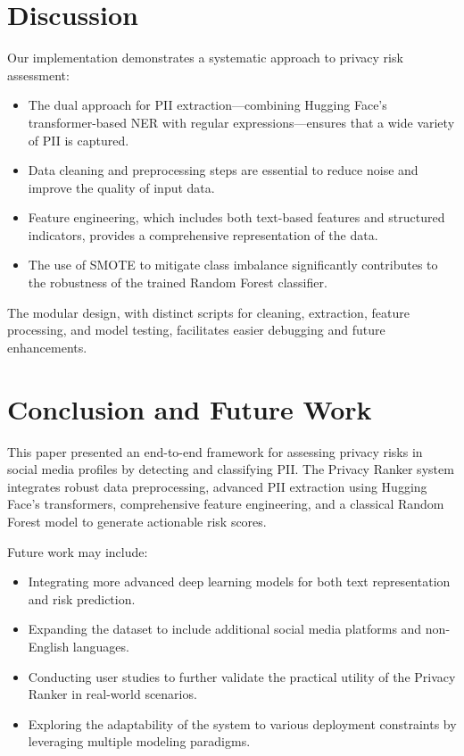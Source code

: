 \documentclass{article}
\begin{document}
\section{Discussion}
Our implementation demonstrates a systematic approach to privacy risk assessment:
\begin{itemize}
    \item The dual approach for PII extraction—combining Hugging Face’s transformer-based NER with regular expressions—ensures that a wide variety of PII is captured.
    \item Data cleaning and preprocessing steps are essential to reduce noise and improve the quality of input data.
    \item Feature engineering, which includes both text-based features and structured indicators, provides a comprehensive representation of the data.
    \item The use of SMOTE to mitigate class imbalance significantly contributes to the robustness of the trained Random Forest classifier.
\end{itemize}
The modular design, with distinct scripts for cleaning, extraction, feature processing, and model testing, facilitates easier debugging and future enhancements.

\section{Conclusion and Future Work}
This paper presented an end-to-end framework for assessing privacy risks in social media profiles by detecting and classifying PII. The Privacy Ranker system integrates robust data preprocessing, advanced PII extraction using Hugging Face’s transformers, comprehensive feature engineering, and a classical Random Forest model to generate actionable risk scores.

Future work may include:
\begin{itemize}
    \item Integrating more advanced deep learning models for both text representation and risk prediction.
    \item Expanding the dataset to include additional social media platforms and non-English languages.
    \item Conducting user studies to further validate the practical utility of the Privacy Ranker in real-world scenarios.
    \item Exploring the adaptability of the system to various deployment constraints by leveraging multiple modeling paradigms.
\end{itemize}
\end{document}
